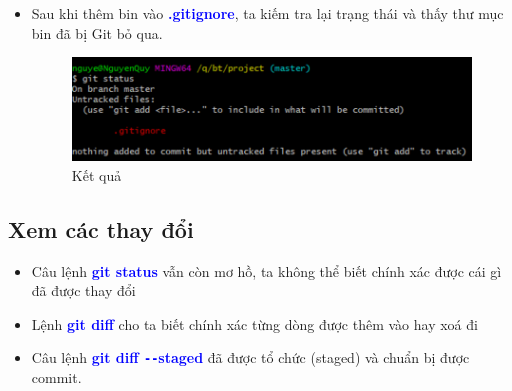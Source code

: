 \documentclass[12pt,a4paper]{report}
\begin{document}
\begin{itemize}
\begin{itemize}
\item Sau khi thêm bin vào \textcolor{blue}{\bf .gitignore}, ta kiếm tra lại trạng thái và thấy thư mục bin đã bị Git bỏ qua.

\begin{figure}[!ht]
	\centering
	\includegraphics[width=0.8\linewidth]{screenshot011}
\caption{Kết quả}
	\label{fig:screenshot011}
	\end{figure}
	
\end{itemize}
\end{itemize}
\subsection{Xem các thay đổi} 
\begin{itemize}
\item Câu lệnh \textcolor{blue}{\bf git status} vẫn còn mơ hồ, ta không thể biết chính xác được cái gì đã được thay đổi
\item Lệnh \textcolor{blue}{\bf git diff} cho ta biết chính xác từng dòng được thêm vào hay xoá đi
\item Câu lệnh \textcolor{blue}{\bf git diff \texttt{-{}-}staged} đã được tổ chức (staged) và chuẩn bị được commit.
\end{itemize}
\end{document}
